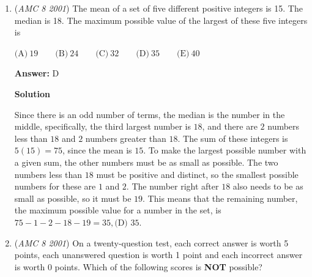 \begin{enumerate}
 \textbf{Answer: }A



\textbf{Solution}

Since the only other score Quay knows is Kaleana's, and he knows that two of them have the same score, Quay and Kaleana must have the same score, and $K=Q$. Marty knows that he didn't get the lowest score, and the only other score he knows is Kaleana's, so Marty must know that Kaleana must have a lower score than him, and $M>K$. Finally, Shana knows that she didn't get the highest score, and the only other score she knows is Kaleana's, so Shana must know that Kaleana must have a higher score than her, and $S<K$. Putting these together and substituting $Q$ for $K$, we have $S<Q<M$, and from least to greatest this is $\text{S, Q, M}$, therefore the answer is $\boxed{\text{A}}$.

 


	\item (\textit{AMC 8 2001}) The mean of a set of five different positive integers is 15. The median is 18. The maximum possible value of the largest of these five integers is


 $\text{(A)}\ 19 \qquad \text{(B)}\ 24 \qquad \text{(C)}\ 32 \qquad \text{(D)}\ 35 \qquad \text{(E)}\ 40$

 \textbf{Answer: }D



\textbf{Solution}

Since there is an odd number of terms, the median is the number in the middle, specifically, the third largest number is $18$, and there are $2$ numbers less than $18$ and $2$ numbers greater than $18$. The sum of these integers is $5(15)=75$, since the mean is $15$. To make the largest possible number with a given sum, the other numbers must be as small as possible. The two numbers less than $18$ must be positive and distinct, so the smallest possible numbers for these are $1$ and $2$. The number right after $18$ also needs to be as small as possible, so it must be $19$. This means that the remaining number, the maximum possible value for a number in the set, is $75-1-2-18-19=35, \boxed{\text{(D) 35}}$.

 


	\item (\textit{AMC 8 2001}) On a twenty-question test, each correct answer is worth 5 points, each unanswered question is worth 1 point and each incorrect answer is worth 0 points. Which of the following scores is \textbf{NOT} possible?



\end{enumerate}
